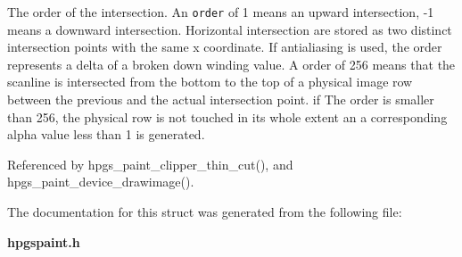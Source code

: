 The order of the intersection. An {\tt order} of 1 means an upward intersection, -1 means a downward intersection. Horizontal intersection are stored as two distinct intersection points with the same x coordinate. If antialiasing is used, the order represents a delta of a broken down winding value. A order of 256 means that the scanline is intersected from the bottom to the top of a physical image row between the previous and the actual intersection point. if The order is smaller than 256, the physical row is not touched in its whole extent an a corresponding alpha value less than 1 is generated. 

Referenced by hpgs\_\-paint\_\-clipper\_\-thin\_\-cut(), and hpgs\_\-paint\_\-device\_\-drawimage().

The documentation for this struct was generated from the following file:\begin{CompactItemize}
\item 
{\bf hpgspaint.h}\end{CompactItemize}
